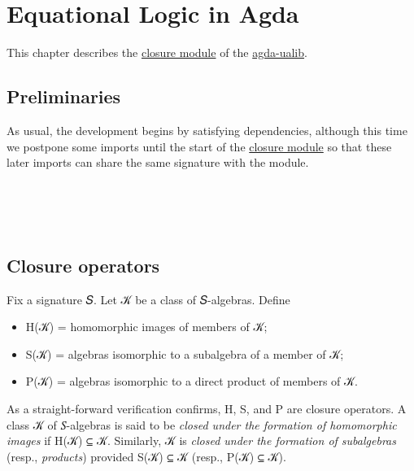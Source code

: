 \documentclass[sigplan,screen]{acmart}
\newcommand{\agdaualib}{\href{https://ualib.org}{agda-ualib}\xspace}
\newcommand\closuremodule{\href{https://gitlab.com/ualib/ualib.gitlab.io/-/blob/master/congruences.lagda.rst}{closure module}\xspace}
\begin{document}
\section{Equational Logic in Agda}\label{equational-logic-in-agda}
This chapter describes the \closuremodule of the \agdaualib.

\subsection{Preliminaries}\label{preliminaries}
As usual, the development begins by satisfying dependencies, although this time we postpone some imports until the start of the \closuremodule so that these later imports can share the same signature with the module.

\begin{code}
\>[0]\AgdaSymbol{\{-\#}\AgdaSpace{}%
\AgdaSpace{}%
\AgdaSpace{}%
\AgdaSpace{}%
\AgdaSpace{}%
\AgdaSymbol{\#-\}}\<%
\\
%
\\[\AgdaEmptyExtraSkip]%
\>[0]\AgdaSpace{}%
\AgdaSpace{}%
\<%
\\
\>[0]\AgdaSpace{}%
\AgdaSpace{}%
\AgdaSpace{}%
\AgdaSpace{}%
\AgdaSymbol{(}\AgdaSymbol{;}\AgdaSpace{}%
\AgdaSymbol{;}\AgdaSpace{}%
\AgdaSymbol{)}\<%
\end{code}

\subsection{Closure operators}\label{closure-operators}
Fix a signature 𝑆. Let 𝒦 be a class of 𝑆-algebras. Define
\begin{itemize}
\item H(𝒦) = homomorphic images of members of 𝒦;
\item S(𝒦) = algebras isomorphic to a subalgebra of a member of 𝒦;
\item P(𝒦) = algebras isomorphic to a direct product of members of 𝒦.
\end{itemize}
As a straight-forward verification confirms, H, S, and P are closure operators. A class 𝒦 of 𝑆-algebras is said to be \emph{closed under the formation of homomorphic images} if H(𝒦) ⊆ 𝒦. Similarly, 𝒦 is \emph{closed under the formation of subalgebras} (resp., \emph{products}) provided S(𝒦) ⊆ 𝒦 (resp., P(𝒦) ⊆ 𝒦).
\end{document}
